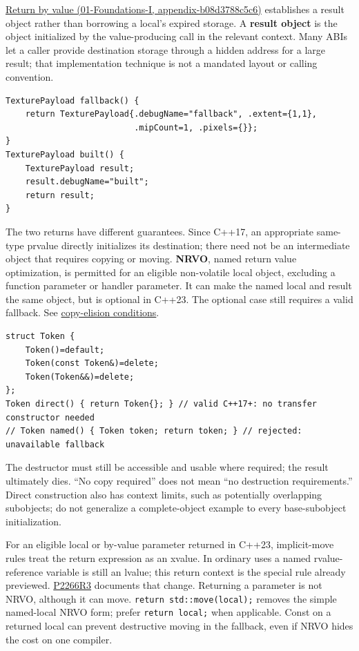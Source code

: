 \href{../01-Foundations-I/main.pdf\#nameddest=appendix-b08d3788c5c6}{Return by value (01-Foundations-I, appendix-b08d3788c5c6)} establishes a result object rather than borrowing a local's expired storage. A \textbf{result object} is the object initialized by the value-producing call in the relevant context. Many ABIs let a caller provide destination storage through a hidden address for a large result; that implementation technique is not a mandated layout or calling convention.

\begin{verbatim}
TexturePayload fallback() {
    return TexturePayload{.debugName="fallback", .extent={1,1},
                          .mipCount=1, .pixels={}};
}
TexturePayload built() {
    TexturePayload result;
    result.debugName="built";
    return result;
}
\end{verbatim}

The two returns have different guarantees. Since C++17, an appropriate same-type prvalue directly initializes its destination; there need not be an intermediate object that requires copying or moving. \textbf{NRVO}, named return value optimization, is permitted for an eligible non-volatile local object, excluding a function parameter or handler parameter. It can make the named local and result the same object, but is optional in C++23. The optional case still requires a valid fallback. See \href{https://eel.is/c++draft/class.copy.elision}{copy-elision conditions}.

\begin{verbatim}
struct Token {
    Token()=default;
    Token(const Token&)=delete;
    Token(Token&&)=delete;
};
Token direct() { return Token{}; } // valid C++17+: no transfer constructor needed
// Token named() { Token token; return token; } // rejected: unavailable fallback
\end{verbatim}

The destructor must still be accessible and usable where required; the result ultimately dies. ``No copy required'' does not mean ``no destruction requirements.'' Direct construction also has context limits, such as potentially overlapping subobjects; do not generalize a complete-object example to every base-subobject initialization.

For an eligible local or by-value parameter returned in C++23, implicit-move rules treat the return expression as an xvalue. In ordinary uses a named rvalue-reference variable is still an lvalue; this return context is the special rule already previewed. \href{https://www.open-std.org/jtc1/sc22/wg21/docs/papers/2022/p2266r3.html}{P2266R3} documents that change. Returning a parameter is not NRVO, although it can move. \texttt{return\ std::move(local);} removes the simple named-local NRVO form; prefer \texttt{return\ local;} when applicable. Const on a returned local can prevent destructive moving in the fallback, even if NRVO hides the cost on one compiler.

